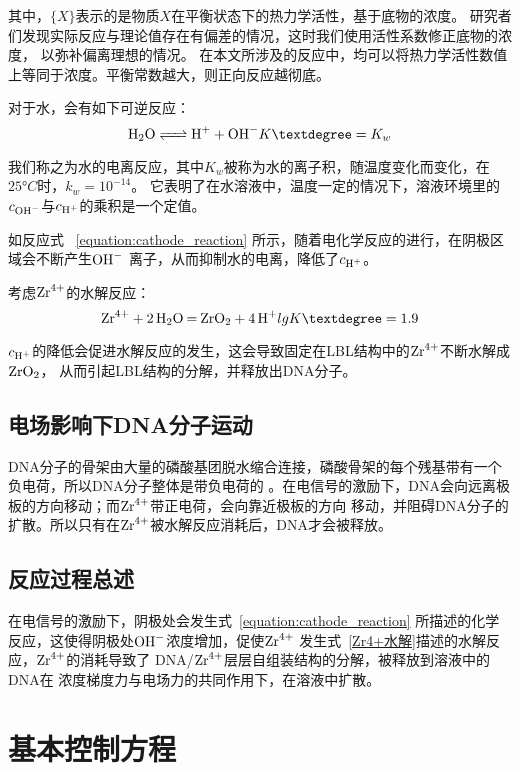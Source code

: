其中，{$\{X\}$}表示的是物质$X$在平衡状态下的热力学活性，基于底物的浓度。
研究者们发现实际反应与理论值存在有偏差的情况，这时我们使用活性系数修正底物的浓度，
以弥补偏离理想的情况\cite{Königsberger2017}。
在本文所涉及的反应中，均可以将热力学活性数值上等同于浓度。平衡常数越大，则正向反应越彻底。

对于水，会有如下可逆反应：
\begin{equation}
    \ce{H2O <=> H+ + OH-} \quad K°=K_w
\end{equation}

我们称之为水的电离反应，其中$K_w$被称为水的离子积，随温度变化而变化，在$25°C$时，$k_w=10^{-14}$。
它表明了在水溶液中，温度一定的情况下，溶液环境里的$c_{\ce{OH-}}$与$c_{\ce{H+}}$的乘积是一个定值。

如反应式 ~\ref{equation:cathode_reaction} 所示，随着电化学反应的进行，在阴极区域会不断产生$\ce{OH-}$
离子，从而抑制水的电离，降低了$c_{\ce{H+}}$。

考虑$\ce{Zr^4+}$的水解反应\cite{Thoenen2004Development}：
\begin{equation}
    \ce{Zr^4+ +2 H2O  = ZrO2 + 4H+} \quad lgK°=1.9
    \label{Zr4+水解}
\end{equation}

$c_{\ce{H+}}$的降低会促进水解反应的发生，这会导致固定在LBL结构中的$\ce{Zr^4+}$不断水解成$\ce{ZrO2}$，
从而引起LBL结构的分解，并释放出DNA分子。

\subsection{电场影响下DNA分子运动}
DNA分子的骨架由大量的磷酸基团脱水缩合连接，磷酸骨架的每个残基带有一个负电荷，所以DNA分子整体是带负电荷的
\cite{Lipfert2014}。在电信号的激励下，DNA会向远离极板的方向移动；而$\ce{Zr^4+}$带正电荷，会向靠近极板的方向
移动，并阻碍DNA分子的扩散。所以只有在$\ce{Zr^4+}$被水解反应消耗后，DNA才会被释放。

\subsection{反应过程总述}
在电信号的激励下，阴极处会发生式~\ref{equation:cathode_reaction}
所描述的化学反应，这使得阴极处$\ce{OH-}$浓度增加，促使$\ce{Zr^4+}$
发生式~\ref{Zr4+水解}描述的水解反应，$\ce{Zr^4+}$的消耗导致了
DNA/$\ce{Zr^{4+}}$层层自组装结构的分解，被释放到溶液中的DNA在
浓度梯度力与电场力的共同作用下，在溶液中扩散。

\section{基本控制方程}
